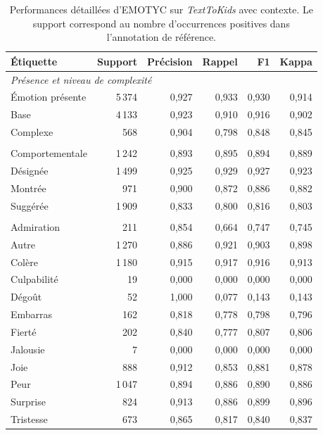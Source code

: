 \begin{table}[htbp]
  \centering
  \scriptsize
  \setlength{\tabcolsep}{5pt}
  \begin{tabular}{lrrrrr}
    \toprule
    Étiquette & Support & Précision & Rappel & F1 & Kappa \\
    \midrule
    \multicolumn{6}{l}{\textit{Présence et niveau de complexité}} \\
    Émotion présente & 5\,374 & 0,927 & 0,933 & 0,930 & 0,914 \\
    Base & 4\,133 & 0,923 & 0,910 & 0,916 & 0,902 \\
    Complexe & 568 & 0,904 & 0,798 & 0,848 & 0,845 \\
    \addlinespace
    \multicolumn{6}{l}{\textit{Modes d'expression}} \\
    Comportementale & 1\,242 & 0,893 & 0,895 & 0,894 & 0,889 \\
    Désignée & 1\,499 & 0,925 & 0,929 & 0,927 & 0,923 \\
    Montrée & 971 & 0,900 & 0,872 & 0,886 & 0,882 \\
    Suggérée & 1\,909 & 0,833 & 0,800 & 0,816 & 0,803 \\
    \addlinespace
    \multicolumn{6}{l}{\textit{Catégories émotionnelles}} \\
    Admiration & 211 & 0,854 & 0,664 & 0,747 & 0,745 \\
    Autre & 1\,270 & 0,886 & 0,921 & 0,903 & 0,898 \\
    Colère & 1\,180 & 0,915 & 0,917 & 0,916 & 0,913 \\
    Culpabilité & 19 & 0,000 & 0,000 & 0,000 & 0,000 \\
    Dégoût & 52 & 1,000 & 0,077 & 0,143 & 0,143 \\
    Embarras & 162 & 0,818 & 0,778 & 0,798 & 0,796 \\
    Fierté & 202 & 0,840 & 0,777 & 0,807 & 0,806 \\
    Jalousie & 7 & 0,000 & 0,000 & 0,000 & 0,000 \\
    Joie & 888 & 0,912 & 0,853 & 0,881 & 0,878 \\
    Peur & 1\,047 & 0,894 & 0,886 & 0,890 & 0,886 \\
    Surprise & 824 & 0,913 & 0,886 & 0,899 & 0,896 \\
    Tristesse & 673 & 0,865 & 0,817 & 0,840 & 0,837 \\
    \bottomrule
  \end{tabular}
  \caption{Performances détaillées d'EMOTYC sur \textit{TextToKids} avec contexte. Le support correspond au nombre d'occurrences positives dans l'annotation de référence.}
  \label{tab:perf-texttokids}
\end{table}

